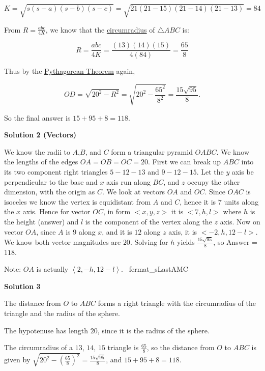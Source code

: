\begin{enumerate}
 
 \[K = \sqrt{s(s-a)(s-b)(s-c)} = \sqrt{21(21-15)(21-14)(21-13)} = 84\]

 From $R = \frac{abc}{4K}$, we know that the \href{https://artofproblemsolving.com/wiki/index.php?title=Circumradius}{circumradius} of $\triangle ABC$ is:

 
 \[R = \frac{abc}{4K} = \frac{(13)(14)(15)}{4(84)} = \frac{65}{8}\]

 Thus by the \href{https://artofproblemsolving.com/wiki/index.php?title=Pythagorean\_Theorem}{Pythagorean Theorem} again,

 
 \[OD = \sqrt{20^2-R^2} = \sqrt{20^2-\frac{65^2}{8^2}} = \frac{15\sqrt{95}}{8}.\]

 So the final answer is $15+95+8=\boxed{118}$.

 



\textbf{Solution 2 (Vectors)}

We know the radii to $A$,$B$, and $C$ form a triangular pyramid $OABC$. We know the lengths of the edges $OA = OB = OC = 20$. First we can break up $ABC$ into its two component right triangles $5-12-13$ and $9-12-15$. Let the $y$ axis be perpendicular to the base and $x$ axis run along $BC$, and $z$ occupy the other dimension, with the origin as $C$. We look at vectors $OA$ and $OC$. Since $OAC$ is isoceles we know the vertex is equidistant from $A$ and $C$, hence it is $7$ units along the $x$ axis. Hence for vector $OC$, in form $<x,y,z>$ it is $<7, h, l>$ where $h$ is the height (answer) and $l$ is the component of the vertex along the $z$ axis. Now on vector $OA$, since $A$ is $9$ along $x$, and it is $12$ along $z$ axis, it is $<-2, h, 12- l>$. We know both vector magnitudes are $20$. Solving for $h$ yields $\frac{15\sqrt{95} }{8}$, so Answer = $\boxed{118}$.

 Note: $OA$ is actually $\left< 2, -h, 12-l \right>$. ~fermat\_sLastAMC

 



\textbf{Solution 3}

The distance from $O$ to $ABC$ forms a  right triangle with the circumradius of the triangle and the radius of the sphere. 

 
The hypotenuse has length $20$, since it is the radius of the sphere.

 
The circumradius of a $13$, $14$, $15$ triangle is $\frac{65}{8}$, so the distance from $O$ to $ABC$ is given by $\sqrt{20^2-(\frac{65}{8})^2} = \frac{15\sqrt{95}}{8}$, and $15+95+8 = \boxed{118}$.


\end{enumerate}
